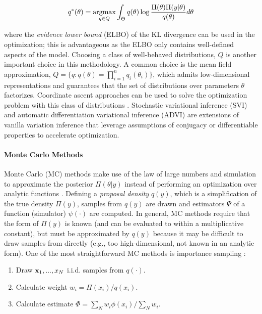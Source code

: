 \begin{equation}
    q^*(\theta) = \mathop\mathrm{arg max}_{q\in Q} \int_\Theta q(\theta) \log \frac{\Pi(\theta)\Pi(y|\theta)}{q(\theta)}d\theta
\end{equation}

\noindent where the \emph{evidence lower bound} (ELBO) of the KL divergence can be used in the optimization; this is advantageous as the ELBO only contains well-defined aspects of the model.
Choosing a class of well-behaved distributions, $Q$ is another important choice in this methodology. A common choice is the mean field approximation, $Q = \{q: q(\theta) = \prod_{i=1}^n q_i(\theta_i)\}$, which admits low-dimensional representations and guarantees that the set of distributions over parameters $\theta$ factorizes. Coordinate ascent approaches can be used to solve the optimization problem with this class of distributions \autocite{wainwright2008graphical}. Stochastic variational inference (SVI) \autocite{hoffman2013stochastic} and automatic differentiation variational inference (ADVI) \autocite{kucukelbir2017automatic} are extensions of vanilla variation inference that leverage assumptions of conjugacy or differentiable properties to accelerate optimization.

\paragraph{Monte Carlo Methods}
Monte Carlo (MC) methods make use of the law of large numbers and simulation to approximate the posterior $\Pi(\theta|y)$ instead of performing an optimization over analytic functions \autocite{mackay1998introduction}. Defining a \emph{proposal density} $q(y)$, which is a simplification of the true density $\Pi(y)$, samples from $q(y)$ are drawn and estimators $\Psi$ of a function (simulator) $\psi(\cdot)$ are computed. In general, MC methods require that the form of $\Pi(y)$ is known (and can be evaluated to within a multiplicative constant), but must be approximated by $q(y)$ because it may be difficult to draw samples from directly (e.g., too high-dimensional, not known in an analytic form). One of the most straightforward MC methods is importance sampling \autocite{glynn1989importance}:

\begin{enumerate}
    \item Draw $\mathbf{x}_1,...,x_N$ i.i.d. samples from $q(\cdot)$.
    \item Calculate weight $w_i = \Pi(x_i) / q(x_i)$.
    \item Calculate estimate $\Phi = \sum_{N} w_i \phi(x_i) / \sum_N w_i$.
\end{enumerate}

